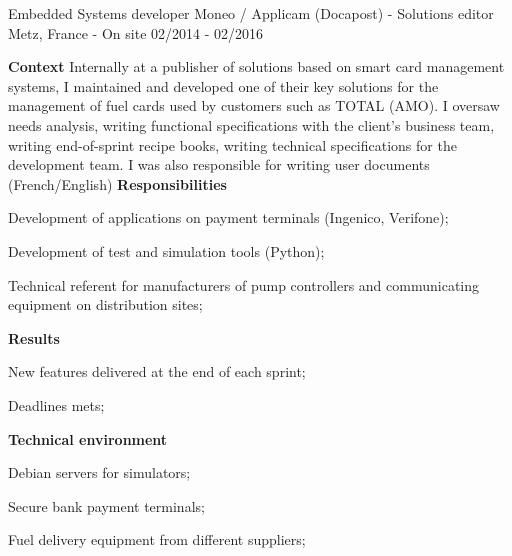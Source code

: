 \begin{cventries}
  \cventry
    {Embedded Systems developer} %
    {Moneo / Applicam (Docapost) - Solutions editor} %
    {Metz, France - On site} %
    {02/2014 - 02/2016} %
    {
      \textbf{Context}
      \newline
      Internally at a publisher of solutions based on smart card management systems, 
      I maintained and developed one of their key solutions for the management of 
      fuel cards used by customers such as TOTAL (AMO).
      \newline
      I oversaw needs analysis, writing functional specifications with the client's 
      business team, writing end-of-sprint recipe books, writing technical specifications 
      for the development team. 
      \newline
      I was also responsible for writing user documents (French/English)
      \newline \vspace{2pt}
      \textbf{Responsibilities}
      \newline \vspace{12pt}
      \begin{cvitems}
        \item {Development of applications on payment terminals (Ingenico, Verifone);}
        \item {Development of test and simulation tools (Python);}
        \item {Technical referent for manufacturers of pump controllers and communicating equipment on distribution sites;}
      \end{cvitems}
      \textbf{Results}
      \newline \vspace{12pt}
      \begin{cvitems}
        \item {New features delivered at the end of each sprint;}
        \item {Deadlines mets;}
      \end{cvitems}
      \textbf{Technical environment}
      \newline \vspace{12pt}
      \begin{cvitems}
        \item {Debian servers for simulators;}
        \item {Secure bank payment terminals;}
        \item {Fuel delivery equipment from different suppliers;}
      \end{cvitems}
    }


\end{cventries}
